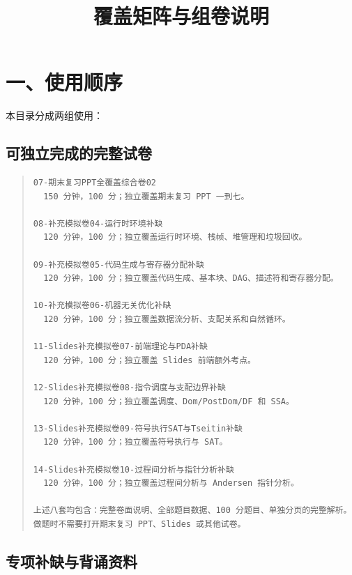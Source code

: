\documentclass[UTF8,zihao=-4]{ctexart}
\title{覆盖矩阵与组卷说明}
\author{}
\date{}
\begin{document}
\maketitle
\setcounter{tocdepth}{1}
\tableofcontents
\newpage

\section*{一、使用顺序}


本目录分成两组使用：

\subsection*{可独立完成的完整试卷}


\begin{quote}
\footnotesize
\begin{verbatim}
07-期末复习PPT全覆盖综合卷02
  150 分钟，100 分；独立覆盖期末复习 PPT 一到七。

08-补充模拟卷04-运行时环境补缺
  120 分钟，100 分；独立覆盖运行时环境、栈帧、堆管理和垃圾回收。

09-补充模拟卷05-代码生成与寄存器分配补缺
  120 分钟，100 分；独立覆盖代码生成、基本块、DAG、描述符和寄存器分配。

10-补充模拟卷06-机器无关优化补缺
  120 分钟，100 分；独立覆盖数据流分析、支配关系和自然循环。

11-Slides补充模拟卷07-前端理论与PDA补缺
  120 分钟，100 分；独立覆盖 Slides 前端额外考点。

12-Slides补充模拟卷08-指令调度与支配边界补缺
  120 分钟，100 分；独立覆盖调度、Dom/PostDom/DF 和 SSA。

13-Slides补充模拟卷09-符号执行SAT与Tseitin补缺
  120 分钟，100 分；独立覆盖符号执行与 SAT。

14-Slides补充模拟卷10-过程间分析与指针分析补缺
  120 分钟，100 分；独立覆盖过程间分析与 Andersen 指针分析。

上述八套均包含：完整卷面说明、全部题目数据、100 分题目、单独分页的完整解析。
做题时不需要打开期末复习 PPT、Slides 或其他试卷。
\end{verbatim}
\end{quote}

\subsection*{专项补缺与背诵资料}
\end{document}
